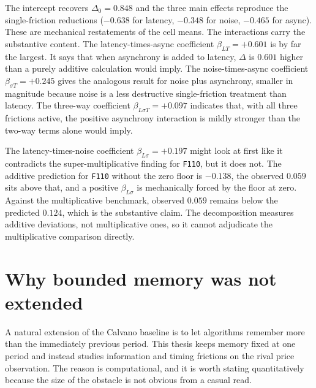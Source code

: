 The intercept recovers $\Delta_0 = 0.848$ and the three main effects reproduce the single-friction reductions ($-0.638$ for latency, $-0.348$ for noise, $-0.465$ for async). These are mechanical restatements of the cell means. The interactions carry the substantive content. The latency-times-async coefficient $\beta_{LT} = +0.601$ is by far the largest. It says that when asynchrony is added to latency, $\Delta$ is $0.601$ higher than a purely additive calculation would imply. The noise-times-async coefficient $\beta_{\sigma T} = +0.245$ gives the analogous result for noise plus asynchrony, smaller in magnitude because noise is a less destructive single-friction treatment than latency. The three-way coefficient $\beta_{L\sigma T} = +0.097$ indicates that, with all three frictions active, the positive asynchrony interaction is mildly stronger than the two-way terms alone would imply.

The latency-times-noise coefficient $\beta_{L\sigma} = +0.197$ might look at first like it contradicts the super-multiplicative finding for \texttt{F110}, but it does not. The additive prediction for \texttt{F110} without the zero floor is $-0.138$, the observed $0.059$ sits above that, and a positive $\beta_{L\sigma}$ is mechanically forced by the floor at zero. Against the multiplicative benchmark, observed $0.059$ remains below the predicted $0.124$, which is the substantive claim. The decomposition measures additive deviations, not multiplicative ones, so it cannot adjudicate the multiplicative comparison directly.

\section{Why bounded memory was not extended}
\label{app:bounded-memory}

A natural extension of the Calvano baseline is to let algorithms remember more than the immediately previous period. This thesis keeps memory fixed at one period and instead studies information and timing frictions on the rival price observation. The reason is computational, and it is worth stating quantitatively because the size of the obstacle is not obvious from a casual read.

